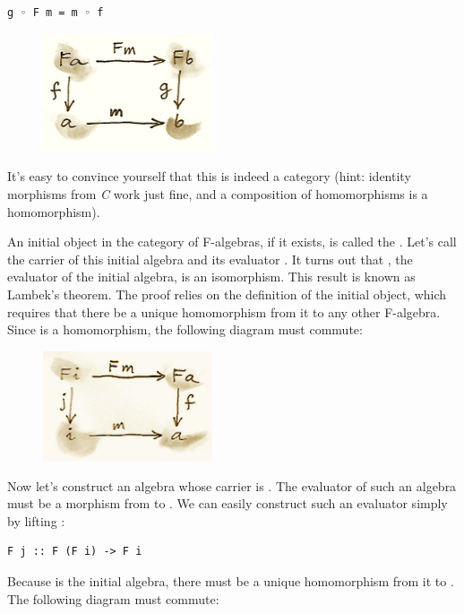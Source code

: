 \begin{verbatim}
g ◦ F m = m ◦ f
\end{verbatim}

\begin{figure}[H]
\centering
\includegraphics[width=50mm]{images/alg.png}
\end{figure}

\noindent
It's easy to convince yourself that this is indeed a category (hint:
identity morphisms from \emph{C} work just fine, and a composition of
homomorphisms is a homomorphism).

An initial object in the category of F-algebras, if it exists, is called
the . Let's call the carrier of this initial
algebra  and its evaluator
. It turns out that ,
the evaluator of the initial algebra, is an isomorphism. This result is
known as Lambek's theorem. The proof relies on the definition of the
initial object, which requires that there be a unique homomorphism
 from it to any other F-algebra. Since  is a
homomorphism, the following diagram must commute:

\begin{figure}[H]
\centering
\includegraphics[width=50mm]{images/alg2.png}
\end{figure}

\noindent
Now let's construct an algebra whose carrier is . The
evaluator of such an algebra must be a morphism from 
to . We can easily construct such an evaluator simply by
lifting :

\begin{verbatim}
F j :: F (F i) -> F i
\end{verbatim}
Because  is the initial algebra, there must be a unique
homomorphism  from it to . The following
diagram must commute:

